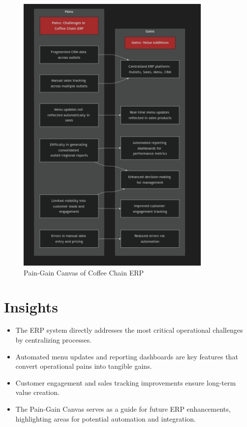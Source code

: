 \begin{figure}[H]
\centering
\includegraphics[width=0.85\textwidth,height=0.6\textheight,keepaspectratio]{diagrams/pain_gain.png}
\caption{Pain-Gain Canvas of Coffee Chain ERP}
\end{figure}

\section*{Insights}

\begin{itemize}
    \item The ERP system directly addresses the most critical operational challenges by centralizing processes.
    \item Automated menu updates and reporting dashboards are key features that convert operational pains into tangible gains.
    \item Customer engagement and sales tracking improvements ensure long-term value creation.
    \item The Pain-Gain Canvas serves as a guide for future ERP enhancements, highlighting areas for potential automation and integration.
\end{itemize}


